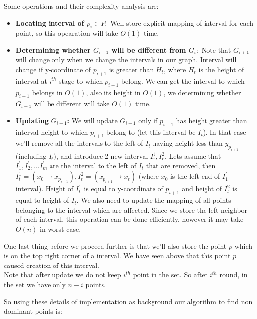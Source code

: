 \documentclass[a4paper]{article}
\begin{document}
Some operations and their complexity analysis are:
\begin{itemize}
	\item \textbf{Locating interval of $p_i \in P: $} Well store explicit mapping of interval for each point, so this opearation will take $O(1)$ time.

	\item \textbf{Determining whether $G_{i+1}$ will be different from $G_i: $} Note that $G_{i+1}$ will change only when we change the intervals in our graph. Interval will change if y-coordinate of $p_{i+1}$  is greater than $H_{t}$, where $H_{t}$ is the height of interval at $i^{th}$ stage to which $p_{i+1}$ belong. We can get the interval to which $p_{i+1}$ belongs in $O(1)$, also its height in $O(1)$, we determining whether $G_{i+1}$ will be different will take $O(1)$ time.

	\item \textbf{Updating $G_{i+1}$: } We will update $G_{i+1}$ only if $p_{i+1}$ has height greater than interval height to which $p_{i+1}$ belong to (let this interval be $I_t$). In that case we'll remove all the intervals to the left of $I_t$ having height less than $y_{p_{i+1}}$ (including $I_t$), and introduce 2 new interval $I^1_t, I^2_t$. Lets assume that $I^{'}_1, I^{'}_2, \ldots I^{'}_m$ are the interval to the left of $I_t$ that are removed, then $I^1_t  = (x_{0} \rightarrow x_{p_{i+1}}), I^2_t = (x_{p_{i+1}} \rightarrow x_t)$ (where $x_0$ is the left end of $I^{'}_1$ interval). Height of $I^1_t$ is equal to y-coordinate of $p_{i+1}$ and height of $I^2_t$ is equal to height of $I_t$. We also need to update the mapping of all points belonging to the interval which are affected. Since we store the left neighbor of each interval, this operation can be done efficiently, however it may take $O(n)$ in worst case. 

\end{itemize}
One last thing before we proceed further is that we'll also store the point $p$ which is on the top right corner of a interval. We have seen above that this point $p$ caused creation of this interval. \\
Note that after update we do not keep $i^{th}$ point in the set. So after $i^{th}$ round, in the set we have only $n-i$ points.

\pagebreak

So using these details of implementation as background our algorithm to find non dominant points is:
\end{document}
